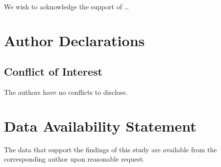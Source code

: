 \documentclass[%
 aip,
 rsi,%
 amsmath,amssymb,
 reprint,%
]{revtex4-1}
\begin{document}
\begin{acknowledgments}
We wish to acknowledge the support of \ldots
\end{acknowledgments}

\section*{Author Declarations}
\subsection*{Conflict of Interest}
The authors have no conflicts to disclose.

\section*{Data Availability Statement}
The data that support the findings of this study are available from the
corresponding author upon reasonable request.

\nocite{*}
\end{document}
